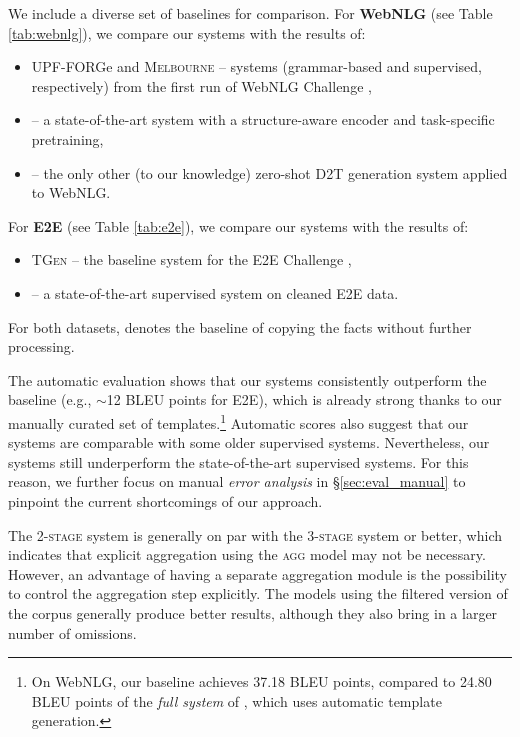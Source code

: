 We include a diverse set of baselines for comparison. For \textbf{WebNLG} (see Table \ref{tab:webnlg}), we compare our systems with the results of:
\begin{itemize}
    \item UPF-FORGe and \textsc{Melbourne} -- systems (grammar-based and supervised, respectively) from the first run of WebNLG Challenge \cite{gardent2017webnlg},
    \item  \citet{ke2021jointgt} -- a state-of-the-art system with a structure-aware encoder and task-specific pretraining,
    \item \citet{laha2020scalable} -- the only other (to our knowledge) zero-shot D2T generation system applied to WebNLG.
\end{itemize}

For \textbf{E2E} (see Table \ref{tab:e2e}), we compare our systems with the results of:
\begin{itemize}[nosep,leftmargin=17pt]
    \item \textsc{TGen} \cite{duvsek2015training} -- the baseline system for the E2E Challenge \cite{duvsek2020evaluating_challenge},
    \item \citet{harkous2020have} -- a state-of-the-art supervised system on cleaned E2E data.
\end{itemize}

For both datasets, \baselinecopy{} denotes the baseline of copying the facts without further processing.

The automatic evaluation shows that our systems consistently outperform the \baselinecopy{} baseline (e.g., $\sim$12 BLEU points for E2E), which is already strong thanks to our manually curated set of templates.\footnote{On WebNLG, our \baselinecopy{} baseline achieves 37.18 BLEU points, compared to 24.80 BLEU points of the \textit{full system} of \citet{laha2020scalable}, which uses automatic template generation.} Automatic scores also suggest that our systems are comparable with some older supervised systems. Nevertheless, our systems still underperform the state-of-the-art supervised systems. For this reason, we further focus on manual \textit{error analysis} in §\ref{sec:eval_manual} to pinpoint the current shortcomings of our approach.

The \textsc{2-stage} system is generally on par with the \textsc{3-stage} system or better, which indicates that explicit aggregation using the \textsc{agg} model may not be necessary. However, an advantage of having a separate aggregation module is the possibility to control the aggregation step explicitly. The models using the filtered version of the corpus generally produce better results, although they also bring in a larger number of omissions.


